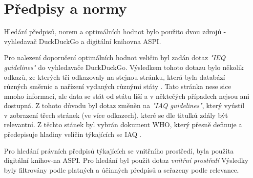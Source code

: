 \section{Předpisy a normy}

Hledání předpisů, norem a optimálních hodnot bylo použito dvou zdrojů - vyhledavač DuckDuckGo a digitální knihovna ASPI.

Pro nalezení doporučení optimálních hodnot veličin byl zadán dotaz \textit{"IEQ guidelines"} do vyhledavače DuckDuckGo. Výsledkem tohoto dotazu bylo několik odkazů, ze kterých tři odkazovaly na stejnou stránku, která byla databází různých směrnic a nařízení vydaných různými státy \parencite{infinityconferencegroupincHomeIEQGuidelines}. Tato stránka nese sice mnoho informací, ale data se stát od státu liší a v něktečých případech nejsou ani dostupná. Z tohoto důvodu byl dotaz změněn na \textit{"IAQ guidelines"}, který vyústil v zobrazení třech stránek (ve více odkazech), které se dle titulků zdály být relevantní. Z těchto stánek byl vybrán dokument WHO, který přesně definuje a předepisuje hladiny veličin týkajících se IAQ \parencite{worldhealthorganizationWHOGlobalAir2021}.

Pro hledání právních předpisů týkajících se vnitřního prostředí, byla použita digitální knihov-na ASPI. Pro hledání byl použit dotaz \textit{vnitřní prostředí} Výsledky byly filtrovány podle platných a účinných předpisů a seřazeny podle relevance.

